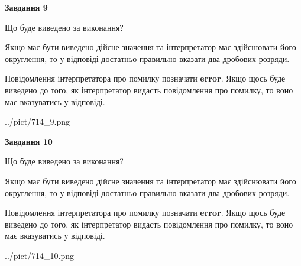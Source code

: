 \documentclass[12pt, ukrainian]{article}
\begin{document}
{\begin {Large}
{\begin {center}\textbf{Завдання 9}\end {center}}\par
Що буде виведено за виконання? \par

Якщо має бути виведено дійсне значення та інтерпретатор має здійснювати його округлення, 
то у відповіді достатньо правильно вказати два дробових розряди.

Повідомлення інтерпретатора про помилку позначати \textbf{error}.
Якщо щось буде виведено до того, як інтерпретатор видасть повідомлення про помилку, 
то воно має вказуватись у відповіді. \par

\begin{center}
	{../pict/714_9.png}
\end{center}
\newpage

{\begin {center}\textbf{Завдання 10}\end {center}}\par
Що буде виведено за виконання? \par

Якщо має бути виведено дійсне значення та інтерпретатор має здійснювати його округлення, 
то у відповіді достатньо правильно вказати два дробових розряди.

Повідомлення інтерпретатора про помилку позначати \textbf{error}.
Якщо щось буде виведено до того, як інтерпретатор видасть повідомлення про помилку, 
то воно має вказуватись у відповіді. \par

\begin{center}
	{../pict/714_10.png}
\end{center}
\newpage

\end {Large}}
\end{document}
